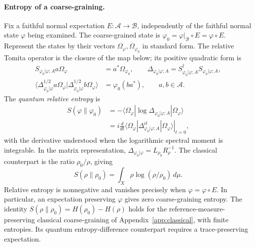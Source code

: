 \documentclass[a4paper,11pt]{article}
\theoremstyle{definition}
\newcommand{\nn}{\nonumber}
\begin{document}
\paragraph{Entropy of a coarse-graining.}
Fix a faithful normal expectation $E:\mathcal A\to\mathcal B$, independently of the
faithful normal state $\varphi$ being examined. The coarse-grained state is
$\varphi_0=\varphi|_{\mathcal B}\circ E=\varphi\circ E$.
Represent the states by their vectors $\Omega_\varphi,\Omega_{\varphi_0}$ in standard form.
The relative Tomita operator is the closure of the map below; its positive quadratic form is
\begin{align}
 S_{\varphi_0|\varphi;A}a\Omega_\varphi
 &=a^*\Omega_{\varphi_0},\qquad
 \Delta_{\varphi_0|\varphi;A}=S_{\varphi_0|\varphi;A}^\dagger S_{\varphi_0|\varphi;A},
 \nn\\
 \langle\Delta_{\varphi_0|\varphi}^{1/2}a\Omega_\varphi|
 \Delta_{\varphi_0|\varphi}^{1/2}b\Omega_\varphi\rangle
 &=\varphi_0(ba^*),\qquad a,b\in\mathcal A.
 \label{eq:relative-modular}
\end{align}
The \emph{quantum relative entropy} is
\begin{align}
 S(\varphi\|\varphi_0)
 &=-\langle\Omega_\varphi|\log\Delta_{\varphi_0|\varphi;A}|\Omega_\varphi\rangle
 \nn\\
 &=i\left.\frac{d}{dt}
 \langle\Omega_\varphi|\Delta_{\varphi_0|\varphi;A}^{it}|\Omega_\varphi\rangle
 \right|_{t=0},
 \label{eq:relative-entropy}
\end{align}
with the derivative understood when the logarithmic spectral moment is integrable.
In the matrix representation, $\Delta_{\varphi_0|\varphi}=L_{\rho_0}R_{\rho}^{-1}$.
The classical counterpart is the ratio $\rho_0/\rho$, giving
\begin{equation}
 S(\rho\|\rho_0)=\int_X\rho\log(\rho/\rho_0)\,d\mu.
 \label{eq:classical-KL}
\end{equation}
Relative entropy is nonnegative and vanishes precisely when $\varphi=\varphi\circ E$.
In particular, an expectation preserving $\varphi$ gives zero coarse-graining entropy.
The identity $S(\rho\|\rho_0)=H(\rho_0)-H(\rho)$ holds for the reference-measure-preserving
classical coarse-graining of Appendix~\ref{app:classical}, with finite entropies.
Its quantum entropy-difference counterpart requires a trace-preserving expectation.
\end{document}
